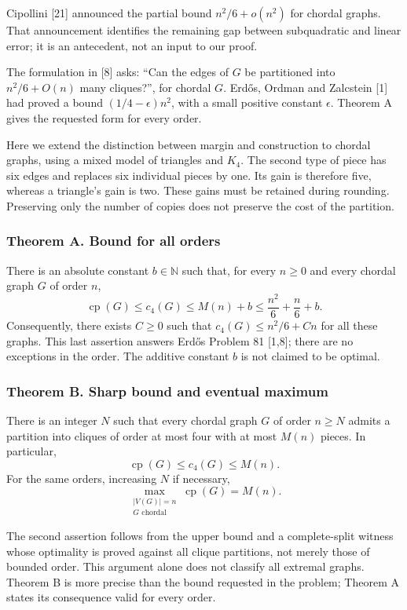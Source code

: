 \documentclass[english,11pt,a4paper]{article}
\begin{document}
Cipollini {[}21{]} announced the partial bound \(n^2/6+o(n^2)\) for chordal graphs. That announcement identifies the remaining gap between subquadratic and linear error; it is an antecedent, not an input to our proof.

The formulation in {[}8{]} asks: ``Can the edges of \(G\) be partitioned into \(n^2/6+O(n)\) many cliques?'', for chordal \(G\). Erdős, Ordman and Zalcstein {[}1{]} had proved a bound \((1/4-\epsilon)n^2\), with a small positive constant \(\epsilon\). Theorem A gives the requested form for every order.

Here we extend the distinction between margin and construction to chordal graphs, using a mixed model of triangles and \(K_4\). The second type of piece has six edges and replaces six individual pieces by one. Its gain is therefore five, whereas a triangle's gain is two. These gains must be retained during rounding. Preserving only the number of copies does not preserve the cost of the partition.

\subsubsection{Theorem A. Bound for all orders}\label{theorem-a.-bound-for-all-orders}

There is an absolute constant \(b\in\mathbb N\) such that, for every \(n\ge0\) and every chordal graph \(G\) of order \(n\), \[
\operatorname{cp}(G)\le c_4(G)\le M(n)+b
\le\frac{n^2}{6}+\frac n6+b.
\tag{A}
\] Consequently, there exists \(C\ge0\) such that \(c_4(G)\le n^2/6+Cn\) for all these graphs. This last assertion answers Erdős Problem 81 {[}1,8{]}; there are no exceptions in the order. The additive constant \(b\) is not claimed to be optimal.

\subsubsection{Theorem B. Sharp bound and eventual maximum}\label{theorem-b.-sharp-bound-and-eventual-maximum}

There is an integer \(N\) such that every chordal graph \(G\) of order \(n\ge N\) admits a partition into cliques of order at most four with at most \(M(n)\) pieces. In particular, \[
\operatorname{cp}(G)\le c_4(G)\le M(n).
\tag{1.1}
\] For the same orders, increasing \(N\) if necessary, \[
\max_{\substack{|V(G)|=n\\G\text{ chordal}}}\operatorname{cp}(G)=M(n).
\tag{1.2}
\]

The second assertion follows from the upper bound and a complete-split witness whose optimality is proved against all clique partitions, not merely those of bounded order. This argument alone does not classify all extremal graphs. Theorem B is more precise than the bound requested in the problem; Theorem A states its consequence valid for every order.
\end{document}
